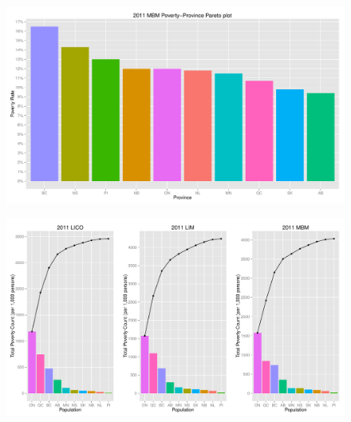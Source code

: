 \documentclass{article}\usepackage[]{graphicx}\usepackage[]{color}
\makeatletter
\def\maxwidth{ %
  \ifdim\Gin@nat@width>\linewidth
    \linewidth
  \else
    \Gin@nat@width
  \fi
}
\newenvironment{knitrout}{}{} %
\makeatother
\begin{document}
\begin{figure}[ht]
\begin{center}
\begin{knitrout}
\color{fgcolor}
\includegraphics[width=\maxwidth]{figure/unnamed-chunk-26} 

\end{knitrout}

\end{center}
\end{figure}
\begin{figure}[ht]
\begin{center}
\begin{knitrout}
\color{fgcolor}
\includegraphics[width=\maxwidth]{figure/unnamed-chunk-27} 

\end{knitrout}

\end{center}
\end{figure}
\end{document}
